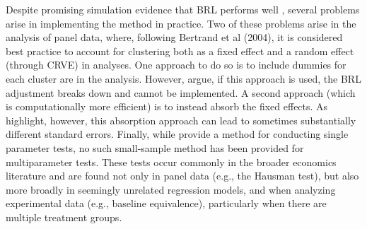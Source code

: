 \documentclass[12pt]{article}
\begin{document}
Despite promising simulation evidence that BRL performs well \citep[e.g.,][]{Imbens2012robust}, several problems arise in implementing the method in practice. 
Two of these problems arise in the analysis of panel data, where, following Bertrand et al (2004), it is considered best practice to account for clustering both as a fixed effect and a random effect (through CRVE) in analyses. 
One approach to do so is to include dummies for each cluster are in the analysis. However, \citet{Angrist2009mostly} argue, if this approach is used, the BRL adjustment breaks down and cannot be implemented.
A second approach (which is computationally more efficient) is to instead absorb the fixed effects. As \citet{Cameron2015practitioners} highlight, however, this absorption approach can lead to sometimes substantially different standard errors. 
Finally, while \citet{Bell2002bias} provide a method for conducting single parameter tests, no such small-sample method has been provided for multiparameter tests.
These tests occur commonly in the broader economics literature and are found not only in panel data (e.g., the Hausman test), but also more broadly in seemingly unrelated regression models, and when analyzing experimental data (e.g., baseline equivalence), particularly when there are multiple treatment groups. 
\end{document}
